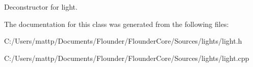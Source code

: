 Deconstructor for light. 



The documentation for this class was generated from the following files\+:\begin{DoxyCompactItemize}
\item 
C\+:/\+Users/mattp/\+Documents/\+Flounder/\+Flounder\+Core/\+Sources/lights/light.\+h\item 
C\+:/\+Users/mattp/\+Documents/\+Flounder/\+Flounder\+Core/\+Sources/lights/light.\+cpp\end{DoxyCompactItemize}
